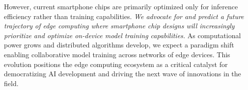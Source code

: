 However, current smartphone chips are primarily optimized only for inference efficiency rather than training capabilities. 
\textit{We advocate for and predict a future trajectory of edge computing where smartphone chip designs will increasingly prioritize and optimize on-device model training capabilities.
}
As computational power grows and distributed algorithms develop, we expect a paradigm shift enabling collaborative model training across networks of edge devices. This evolution positions the edge computing ecosystem as a critical catalyst for democratizing AI development and driving the next wave of innovations in the field.



